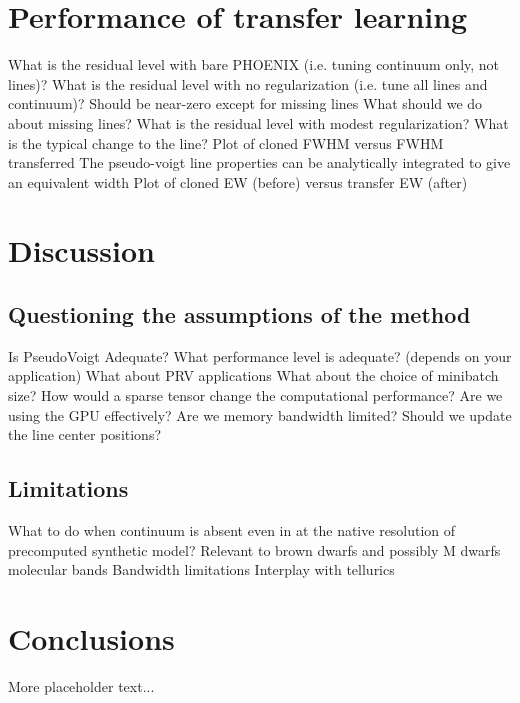 \documentclass[modern]{aastex631}
\begin{document}
\section{Performance of transfer learning}
\begin{outline}
  \1 What is the residual level with bare PHOENIX (i.e. tuning continuum only, not lines)?
  \1 What is the residual level with no regularization (i.e. tune all lines and continuum)?
  \2 Should be near-zero except for missing lines
  \2  What should we do about missing lines?
  \1 What is the residual level with modest regularization?  What is the typical change to the line?
  \2 Plot of cloned FWHM versus FWHM transferred
  \2 The pseudo-voigt line properties can be analytically integrated to give an equivalent width
  \2 Plot of cloned EW (before) versus transfer EW (after)
\end{outline}

\section{Discussion}

\subsection{Questioning the assumptions of the method}
\begin{outline}
  \1 Is PseudoVoigt Adequate?
  \1 What performance level is adequate? (depends on your application)
  \1 What about PRV applications
  \1 What about the choice of minibatch size?
  \1 How would a sparse tensor change the computational performance?
  \1 Are we using the GPU effectively?  Are we memory bandwidth limited?
  \1 Should we update the line center positions?
\end{outline}

\subsection{Limitations}
\begin{outline}
  \1 What to do when continuum is absent even in at the native resolution of precomputed synthetic model?
  \1 Relevant to brown dwarfs and possibly M dwarfs molecular bands
  \1 Bandwidth limitations
  \1 Interplay with tellurics
\end{outline}

\section{Conclusions}
More placeholder text...
\end{document}
